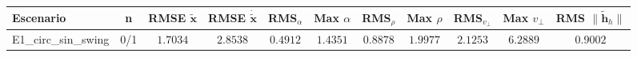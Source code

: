 \begin{tabular}{lcccccccccc}
\toprule
Escenario & n & RMSE $\tilde{\mathbf{x}}$ & RMSE $\dot{\tilde{\mathbf{x}}}$ & RMS$_\alpha$ & Max $\alpha$ & RMS$_\rho$ & Max $\rho$ & RMS$_{v_\perp}$ & Max $v_\perp$ & RMS $\|\tilde{\mathbf{h}}_h\|$ \\
\midrule
E1\_circ\_sin\_swing & 0/1 & $1.7034$ & $2.8538$ & $0.4912$ & $1.4351$ & $0.8878$ & $1.9977$ & $2.1253$ & $6.2889$ & $0.9002$ \\
\bottomrule
\end{tabular}
